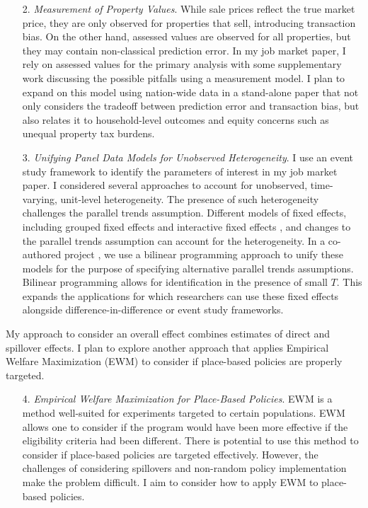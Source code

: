 \begin{enumerate}
\item[2.] \textit{Measurement of Property Values}. While sale prices reflect the true market price, they are only observed for properties that sell, introducing transaction bias. On the other hand, assessed values are observed for all properties, but they may contain non-classical prediction error. In my job market paper, I rely on assessed values for the primary analysis with some supplementary work discussing the possible pitfalls using a measurement model. I plan to expand on this model using nation-wide data in a stand-alone paper that not only considers the tradeoff between prediction error and transaction bias, but also relates it to household-level outcomes and equity concerns such as unequal property tax burdens. 

\item[3.] \textit{Unifying Panel Data Models for Unobserved Heterogeneity}. I use an event study framework to identify the parameters of interest in my job market paper. I considered several approaches to account for unobserved, time-varying, unit-level heterogeneity. The presence of such heterogeneity challenges the parallel trends assumption. Different models of fixed effects, including grouped fixed effects and interactive fixed effects \citep{bai_panel_2009,bonhomme_grouped_2015}, and changes to the parallel trends assumption can account for the heterogeneity. In a co-authored project \citep{shea_unifying_2023}, we use a bilinear programming approach to unify these models for the purpose of specifying alternative parallel trends assumptions. Bilinear programming allows for identification in the presence of small $T$. This expands the applications for which researchers can use these fixed effects alongside difference-in-difference or event study frameworks.
\end{enumerate} 

My approach to consider an overall effect combines estimates of direct and spillover effects. I plan to explore another approach that applies Empirical Welfare Maximization (EWM) to consider if place-based policies are properly targeted.

\begin{enumerate}
\item[4.] \textit{Empirical Welfare Maximization for Place-Based Policies}. EWM \citep{kitagawa_who_2018} is a method well-suited for experiments targeted to certain populations. EWM allows one to consider if the program would have been more effective if the eligibility criteria had been different. There is potential to use this method to consider if place-based policies are targeted effectively. However, the challenges of considering spillovers and non-random policy implementation make the problem difficult. I aim to consider how to apply EWM to place-based policies.
\end{enumerate}

